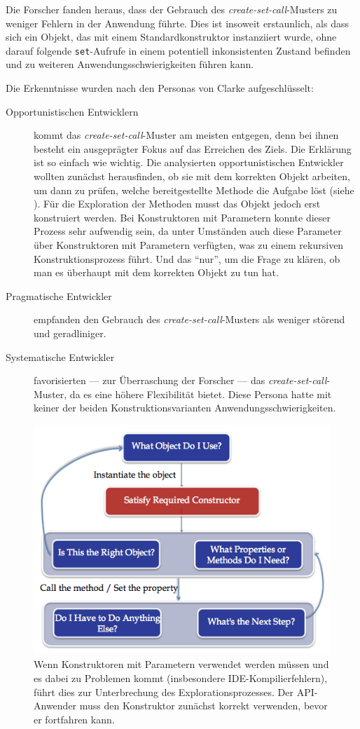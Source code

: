 Die Forscher fanden heraus, dass der Gebrauch des \textit{create-set-call}-Musters zu weniger Fehlern in der Anwendung führte. Dies ist insoweit erstaunlich, als dass sich ein Objekt, das mit einem Standardkonstruktor instanziiert wurde, ohne darauf folgende \texttt{set}-Aufrufe in einem potentiell inkonsistenten Zustand befinden und zu weiteren Anwendungsschwierigkeiten führen kann.

Die Erkenntnisse wurden nach den Personas von Clarke \cite[][siehe ]{clarke:DSP:2007:1080} aufgeschlüsselt:
\begin{description}
  \item[Opportunistischen Entwicklern] kommt das \textit{create-set-call}-Muster am meisten entgegen, denn bei ihnen besteht ein ausgeprägter Fokus auf das Erreichen des Ziels. Die Erklärung ist so einfach wie wichtig. Die analysierten opportunistischen Entwickler wollten zunächst herausfinden, ob sie mit dem korrekten Objekt arbeiten, um dann zu prüfen, welche bereitgestellte Methode die Aufgabe löst (siehe ). Für die Exploration der Methoden musst das Objekt jedoch erst konstruiert werden. Bei Konstruktoren mit Parametern konnte dieser Prozess sehr aufwendig sein, da unter Umständen auch diese Parameter über Konstruktoren mit Parametern verfügten, was zu einem rekursiven Konstruktionsprozess führt. Und das ``nur'', um die Frage zu klären, ob man es überhaupt mit dem korrekten Objekt zu tun hat.
  \item[Pragmatische Entwickler] empfanden den Gebrauch des \textit{create-set-call}-Musters als weniger störend und geradliniger.
  \item[Systematische Entwickler] favorisierten --- zur Überraschung der Forscher --- das \textit{create-set-call}-Muster, da es eine höhere Flexibilität bietet. Diese Persona hatte mit keiner der beiden Konstruktionsvarianten Anwendungsschwierigkeiten.
\end{description}

\begin{figure}
  \centering
    \includegraphics[width=0.6\linewidth]{Figures/CreateAndUseObjectMode.png}
    \caption[Problemlösung bei Verwendung von Konstruktoren mit und ohne Parametern]{Wenn Konstruktoren mit Parametern verwendet werden müssen und es dabei zu Problemen kommt (insbesondere IDE-Kompilierfehlern), führt dies zur Unterbrechung des Explorationsprozesses. Der API-Anwender muss den Konstruktor zunächst korrekt verwenden, bevor er fortfahren kann. \citep{Stylos:2007jb}}
    \label{fig:CreateAndUseObjectMode}
\end{figure}

